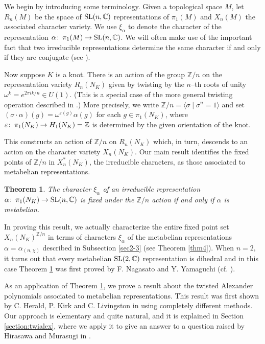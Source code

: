 \documentclass[12pt]{amsart}
\theoremstyle{plain}
\newtheorem{thm}{Theorem}
\theoremstyle{remark}
\begin{document}
We begin by introducing some terminology.
Given a topological space $M$, let $R_n(M)$ be the space
 of ${{\rm SL}}(n,{{\mathbb C}})$ representations of $\pi_1(M)$   and
 $X_n(M)$ the associated character variety.
 We use $\xi_{\alpha}$ to denote the character of the representation
 ${\alpha} {\colon\thinspace} \pi_1(M) \to {{\rm SL}}(n,{{\mathbb C}})$. We will often make use of the important fact
 that two irreducible representations
 determine the same character if and only if they are conjugate (see \cite[Corollary 1.33]{LM85}).

Now suppose $K$ is a knot.
There is an action  of the group ${{\mathbb Z}}/n$ on the representation variety
$R_n(N_K)$ given by twisting by the $n$--th roots of unity ${\omega}^k= e^{2 \pi ik/n} \in U(1)$.
(This is a special case of the more general twisting operation described in \cite[Ch. 5]{LM85}.)
More precisely, we write ${{\mathbb Z}}/n = \langle {\sigma} \mid {\sigma}^n=1\rangle$ and
set
$({\sigma} \cdot {\alpha})(g) = {\omega}^{{\varepsilon}(g)} {\alpha}(g)$ for each  $g \in \pi_1(N_K)$,
where ${\varepsilon} {\colon\thinspace} \pi_1(N_K) \to H_1(N_K) = {{\mathbb Z}}$ is determined by the given orientation of the knot.

This constructs an  action of ${{\mathbb Z}}/n$ on $R_n(N_K)$
which, in turn, descends to an action
on the character variety $X_n(N_K)$.
Our main result identifies the fixed points of
${{\mathbb Z}}/n$ in $X_n^*(N_K)$, the irreducible characters, as those associated to
metabelian representations.

\begin{thm}\label{thm1}
The character $\xi_{\alpha}$ of an irreducible representation  ${\alpha} {\colon\thinspace} \pi_1(N_K) \to {{\rm SL}}(n,{{\mathbb C}})$ is
fixed under the ${{\mathbb Z}}/n$ action if and only if ${\alpha}$ is metabelian.
\end{thm}

In proving this result, we actually characterize the entire fixed point set  $X_n(N_K)^{{{\mathbb Z}}/n}$
in terms of characters $\xi_{\alpha}$ of the metabelian representations ${\alpha}={\alpha}_{(n,\chi)}$
described in Subsection \ref{sec2-3} (see  Theorem \ref{thm4}).
When $n=2,$ it turns out that every metabelian ${{\rm SL}}(2,{{\mathbb C}})$ representation is dihedral and in this case
Theorem \ref{thm1} was first proved by F. Nagasato and Y. Yamaguchi (cf. \cite[Proposition 4.8]{NY08}).

As an application of Theorem \ref{thm1}, we prove a
result about the twisted Alexander polynomials associated  to metabelian representations.
This result was first shown by C. Herald, P. Kirk and C. Livingston in \cite{HKL08} using completely
different methods. Our approach is elementary and quite natural, and it is explained in Section  \ref{section:twialex}, where we apply it to give an answer
to a question raised by Hirasawa and Murasugi in \cite{HM09}.
\end{document}
